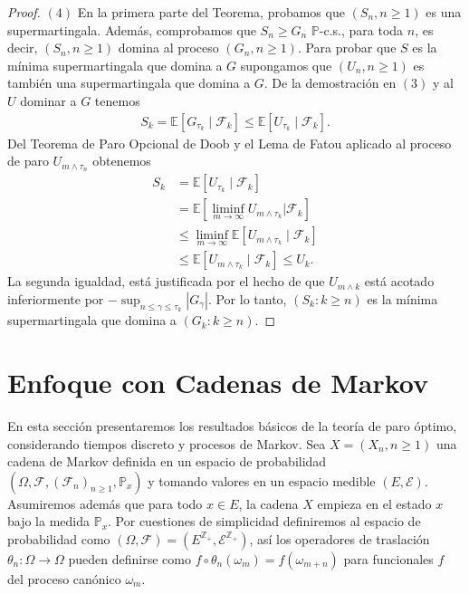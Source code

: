 \begin{proof}
\noindent $(4)$ En la primera parte del Teorema, probamos que $(S_n, n \geq 1)$ es una supermartingala. Además, comprobamos que $S_n \geq G_n$ $\mathbb{P}$-c.s., para toda $n$, es decir, $(S_n, n \geq 1)$ domina al proceso $(G_n, n \geq 1)$. Para probar que $S$ es la mínima supermartingala que domina a $G$ supongamos que $(U_n, n \geq 1)$ es también una supermartingala que domina a $G$. De la demostración en $(3)$ y al $U$ dominar a $G$ tenemos
	\begin{align*}
	S_k = \mathbb{E}[G_{\tau_k} \mid \mathcal{F}_k] \leq \mathbb{E}[U_{\tau_k} \mid \mathcal{F}_k].
	\end{align*}
Del Teorema de Paro Opcional de Doob y el Lema de Fatou aplicado al proceso de paro $U_{m \wedge \tau_n}$ obtenemos
	\begin{align*}
	S_k & = \mathbb{E}[U_{\tau_k} \mid \mathcal{F}_k] \\
    & = \mathbb{E} \left[ \liminf_{m \rightarrow \infty} U_{m \wedge \tau_k } \bigg| \mathcal{F}_k \right] \\
    & \leq \liminf_{m \rightarrow \infty} \mathbb{E}[U_{m \wedge \tau_k } \mid \mathcal{F}_k] \\
    & \leq \mathbb{E}[U_{m \wedge \tau_k } \mid \mathcal{F}_k] \leq U_k.
	\end{align*}
La segunda igualdad, está justificada por el hecho de que $U_{m \wedge k}$ está acotado inferiormente por $- \sup_{n \leq \gamma \leq \tau_k} |G_{\gamma} |$. Por lo tanto, $(S_k : k \geq n)$ es la mínima supermartingala que domina a $(G_k : k \geq n)$.

\end{proof}

\section{Enfoque con Cadenas de Markov}
En esta sección presentaremos los resultados básicos de la teoría de paro óptimo, considerando tiempos discreto y procesos de Markov. Sea $X = (X_n, n \geq 1)$ una cadena de Markov definida en un espacio de probabilidad $(\Omega, \mathcal{F}, (\mathcal{F}_n)_{n \geq 1}, \mathbb{P}_x)$ y tomando valores en un espacio medible $(E, \mathcal{E})$. Asumiremos además que para todo $x \in E$, la cadena $X$ empieza en el estado $x$ bajo la medida $\mathbb{P}_x$. Por cuestiones de simplicidad  definiremos al espacio de probabilidad como $(\Omega, \mathcal{F}) = (E^{\mathbb{Z}_{+}}, \mathcal{E}^{\mathbb{Z}_{+}})$, así los operadores de traslación $\theta_n : \Omega \rightarrow \Omega$ pueden definirse como $f \circ \theta_n (\omega_{m}) = f(\omega_{m+n})$ para funcionales $f$ del proceso canónico $\omega_m$. \\

